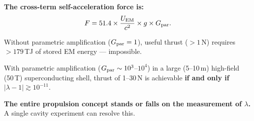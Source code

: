 \documentclass[11pt]{article}
\begin{document}
\begin{tcolorbox}[colback=green!5!white, colframe=green!50!black,
  title=Key Result]
\textbf{The cross-term self-acceleration force is:}
\begin{equation}
F = 51.4 \times \frac{U_{\rm EM}}{c^2} \times g \times G_{\rm par}.
\end{equation}

Without parametric amplification ($G_{\rm par} = 1$), useful thrust ($>1$\,N)
requires $>179$\,TJ of stored EM energy --- impossible.

With parametric amplification ($G_{\rm par} \sim 10^3$--$10^4$) in a large
(5--10\,m) high-field (50\,T) superconducting shell, thrust of 1--30\,N is
achievable \textbf{if and only if} $|\lambda - 1| \gtrsim 10^{-11}$.

\textbf{The entire propulsion concept stands or falls on the measurement
of $\lambda$.} A single cavity experiment can resolve this.
\end{tcolorbox}
\end{document}
